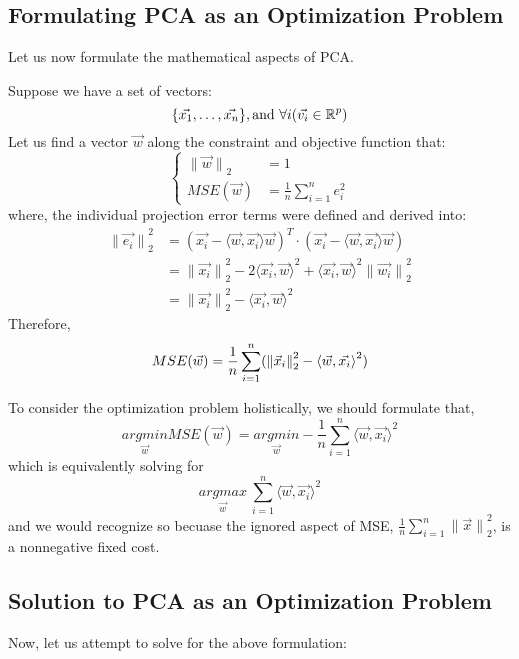 \subsection{Formulating PCA as an Optimization Problem}
Let us now formulate the mathematical aspects of PCA.
\par
Suppose we have a set of vectors:
\[
    \{\vec{x_1}, \dots, \vec{x_n}\}, \text{and } \forall i (\vec{v_i} \in \R^p)
\]
Let us find a vector $\vec{w}$ along the constraint and objective function that:
\[
    \begin{cases}
        {\lVert \vec{w} \rVert}_2 &= 1 \\
        MSE(\vec{w}) &= \frac{1}{n} \sum_{i = 1}^n e_i^2
    \end{cases}
\]
where, the individual projection error terms were defined and derived into:
\begin{align*}
    {\lVert \vec{e_i} \rVert}_2^2
    &= {(\vec{x_i} - \langle \vec{w}, \vec{x_i} \rangle \vec{w})}^T \cdot (\vec{x_i} - \langle \vec{w}, \vec{x_i} \rangle \vec{w}) \\
    &= {\lVert \vec{x_i} \rVert}_2^2 - 2 {\langle \vec{x_i}, \vec{w} \rangle}^2 + {\langle \vec{x_i}, \vec{w} \rangle}^2 {\lVert \vec{w_i} \rVert}_2^2 \\
    &= {\lVert \vec{x_i} \rVert}_2^2 - {\langle \vec{x_i}, \vec{w} \rangle}^2
\end{align*}
Therefore,
\[
    MSE(\vec{w}) = \frac{1}{n} \sum_{i = 1}^n (\pnorm[2]{\vec{x}_i}{2} - {\langle \vec{w}, \vec{x_i} \rangle}^2)
\]
\par
To consider the optimization problem holistically, we should formulate that,
\[
    \underset{\vec{w}}{argmin} MSE(\vec{w}) = \underset{\vec{w}}{argmin} -\frac{1}{n} \sum_{i = 1}^n {\langle \vec{w}, \vec{x_i} \rangle}^2
\]
which is equivalently solving for
\[
    \underset{\vec{w}}{argmax} \ \sum_{i = 1}^n {\langle \vec{w}, \vec{x_i} \rangle}^2
\]
and we would recognize so becuase the ignored aspect of MSE, $\frac{1}{n} \sum_{i = 1}^n {\lVert \vec{x} \rVert}_2^2$, is a nonnegative fixed cost.

\subsection{Solution to PCA as an Optimization Problem}
Now, let us attempt to solve for the above formulation:


